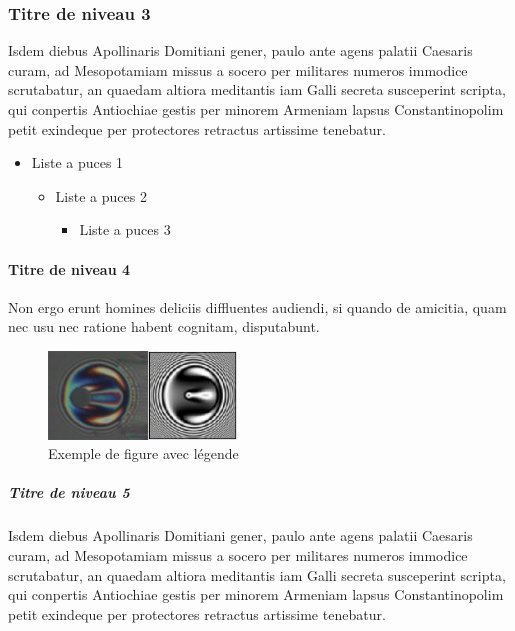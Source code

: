 \subsubsection{Titre de niveau 3}
Isdem diebus Apollinaris Domitiani gener, paulo ante agens palatii Caesaris curam, ad Mesopotamiam missus a socero per militares numeros immodice scrutabatur, an quaedam altiora meditantis iam Galli secreta susceperint scripta, qui conpertis Antiochiae gestis per minorem Armeniam lapsus Constantinopolim petit exindeque per protectores retractus artissime tenebatur.

\begin{itemize}
\item Liste a puces 1
			\begin{itemize}
			\item Liste a puces 2
						\begin{itemize}
						\item Liste a puces 3
						\end{itemize}
			\end{itemize}
\end{itemize} 

\paragraph{Titre de niveau 4}
Non ergo erunt homines deliciis diffluentes audiendi, si quando de amicitia, quam nec usu nec ratione habent cognitam, disputabunt.

\begin{figure}[H]
	\center
	\includegraphics[width=5cm]{body/images/figure_example.png} 
	\caption{Exemple de figure avec légende}
	\label{fig:exemple}
\end{figure}

\subparagraph{Titre de niveau 5}

Isdem diebus Apollinaris Domitiani gener, paulo ante agens palatii Caesaris curam, ad Mesopotamiam missus a socero per militares numeros immodice scrutabatur, an quaedam altiora meditantis iam Galli secreta susceperint scripta, qui conpertis Antiochiae gestis per minorem Armeniam lapsus Constantinopolim petit exindeque per protectores retractus artissime tenebatur.

